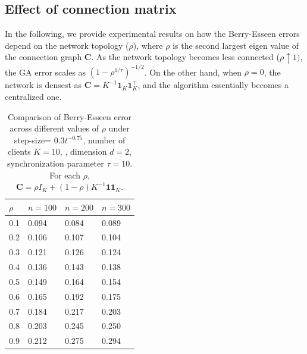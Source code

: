 \documentclass[a4paper,11pt]{article}
\numberwithin{equation}{section}
\theoremstyle{plain}
\theoremstyle{remark}
\begin{document}
\subsection{Effect of connection matrix}
 In the following, we provide experimental results on how the Berry-Esseen errors depend on the network topology ($\rho$), where $\rho$ is the second largest eigen value of the connection graph $\mathbf{C}$. As the network topology becomes less connected ($\rho \uparrow1)$, the GA error scales as $(1- \rho^{1/\tau})^{-1/2}$. On the other hand, when $\rho=0$, the network is densest as $\mathbf{C} = K^{-1} \mathbf{1}_K \mathbf{1}_K^\top$, and the algorithm essentially becomes a centralized one. 
\begin{table}[h]
\centering
\begin{tabular}{|l|l|l|l|}
\hline
$\rho$ & $n=100$ & $n=200$ & $n=300$ \\
\hline
0.1 & 0.094 & 0.084 & 0.089 \\
0.2 & 0.106 & 0.107 & 0.104 \\
0.3 & 0.121 & 0.126 & 0.124 \\
0.4 & 0.136 & 0.143 & 0.138 \\
0.5 & 0.149 & 0.164 & 0.154 \\
0.6 & 0.165 & 0.192 & 0.175 \\
0.7 & 0.184 & 0.217 & 0.203 \\
0.8 & 0.203 & 0.245 & 0.250 \\
0.9 & 0.212 & 0.275 & 0.294 \\
\hline
\end{tabular}
\caption{Comparison of Berry-Esseen error across different values of $\rho$ under step-size= $0.3t^{-0.75}$, number of clients $K=10$, , dimension $d=2$, synchronization parameter $\tau=10$. For each $\rho$, $\mathbf{C}= \rho I_K + (1-\rho)K^{-1}\mathbf{1}\mathbf{1}_K$.}
\end{table}
\end{document}
